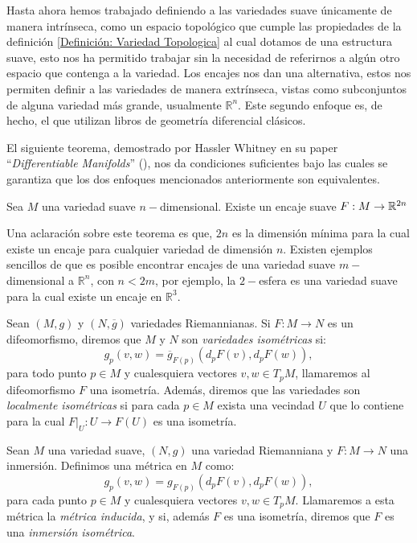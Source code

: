 Hasta ahora hemos trabajado definiendo a las variedades suave únicamente de manera intrínseca, como un espacio topológico que cumple las propiedades de la definición \ref{Definición: Variedad Topologica} al cual dotamos de una estructura suave, esto nos ha permitido trabajar sin la necesidad de referirnos a algún otro espacio que contenga a la variedad. Los encajes nos dan una alternativa, estos nos permiten definir a las variedades de manera extrínseca, vistas como subconjuntos de alguna variedad más grande, usualmente $\mathbb{R}^{n}$. Este segundo enfoque es, de hecho, el que utilizan libros de geometría diferencial clásicos.

El siguiente teorema, demostrado por Hassler Whitney en su paper \enquote{\textit{Differentiable Manifolds}} (\textcite{whitney1936differentiable}), nos da condiciones suficientes bajo las cuales se garantiza que los dos enfoques mencionados anteriormente son equivalentes.

\begin{theorem}
	Sea $M$ una variedad suave $n-$dimensional. Existe un encaje suave $F: M \to \mathbb{R}^{2n}$
\end{theorem}

Una aclaración sobre este teorema es que, $2n$ es la dimensión mínima para la cual existe un encaje para cualquier variedad de dimensión $n$. Existen ejemplos sencillos de que es posible encontrar encajes de una variedad suave $m-$dimensional a $\mathbb{R}^{n}$, con $n < 2m$, por ejemplo, la $2-$esfera es una variedad suave para la cual existe un encaje en $\mathbb{R}^{3}$.

\begin{definition}[Isometría]
	Sean $(M,g)$ y $(N,\overline{g})$ variedades Riemannianas. Si $F: M \to N$ es un difeomorfismo, diremos que $M$ y $N$ son \textit{variedades isométricas} si:
	\[
		g_{p}(v,w) = \overline{g}_{F(p)}(d_{p}F(v), d_{p}F(w)),
	\]
	para todo punto $p \in M$ y cualesquiera vectores $v,w \in T_{p}M$, llamaremos al difeomorfismo $F$ una isometría.
	Además, diremos que las variedades son \textit{localmente isométricas} si para cada $p \in M$ exista una vecindad $U$ que lo contiene para la cual $F|_{U} : U \to F(U)$ es una isometría.
\end{definition}

\begin{definition}
	Sean $M$ una variedad suave, $(N,g)$ una variedad Riemanniana y $F: M \to N$ una inmersión. Definimos una métrica en $M$ como:
	\[
		g_{p}(v,w) = g_{F(p)}(d_{p}F(v), d_{p}F(w)),
	\]
	para cada punto $p \in M$ y cualesquiera vectores $v, w \in T_{p}M$. Llamaremos a esta métrica la \textit{métrica inducida}, y si, además $F$ es una isometría, diremos que $F$ es una \textit{inmersión isométrica}.
\end{definition}

